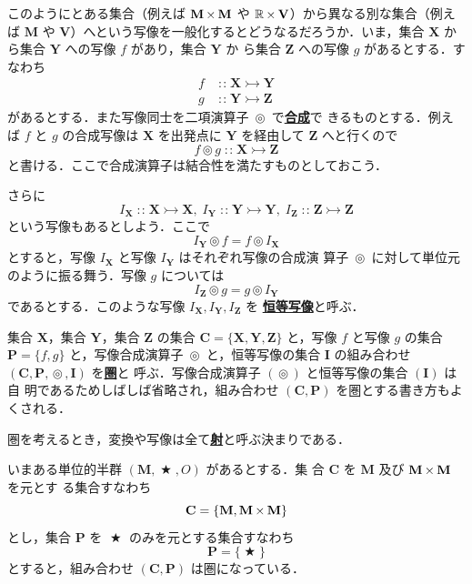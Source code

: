 \documentclass[a5paper,twoside,fleqn,draft]{jsbook}
\newcommand{\keyword}[1]{{\underline{\textbf{#1}}}}
\DeclareMathOperator{\mBinOp}{\bigstar}
\DeclareMathOperator{\mCompProj}{\circledcirc}
\DeclareMathOperator{\mIn}{{:\!:}}
\DeclareMathOperator{\mMorphTo}{\rightarrowtail} %
\DeclareMathOperator{\mSetTimes}{\bf{\times}} %
\newcommand{\mSet}[1]{\mathbf{#1}}
\newcommand{\mSpecialSet}[1]{\mathbb{#1}}
\newcommand{\mRSet}{\mSpecialSet{R}}
\newcommand{\mTupleWith}[1]{\left(#1\right)}
\newcommand{\mMorph}[2]{#1\mMorphTo#2} %
\begin{document}
このようにとある集合（例えば $\mSet{M}\mSetTimes\mSet{M}$ や
$\mRSet\mSetTimes\mSet{V}$）から異なる別な集合（例えば $\mSet{M}$ や
$\mSet{V}$）へという写像を一般化するとどうなるだろうか．いま，集合
$\mSet{X}$ から集合 $\mSet{Y}$ への写像 $f$ があり，集合 $\mSet{Y}$ か
ら集合 $\mSet{Z}$ への写像 $g$ があるとする．すなわち
\begin{align}
f&\mIn\mMorph{\mSet{X}}{\mSet{Y}}\\
g&\mIn\mMorph{\mSet{Y}}{\mSet{Z}}
\end{align}
があるとする．また写像同士を二項演算子 $\mCompProj$ で\keyword{合成}で
きるものとする．例えば $f$ と $g$ の合成写像は $\mSet{X}$ を出発点に
$\mSet{Y}$ を経由して $\mSet{Z}$ へと行くので
\begin{equation}
f\mCompProj g\mIn\mMorph{\mSet{X}}{\mSet{Z}}
\end{equation}
と書ける．ここで合成演算子は結合性を満たすものとしておこう．

さらに
\begin{equation}
I_\mSet{X}\mIn\mMorph{\mSet{X}}{\mSet{X}},\;
I_\mSet{Y}\mIn\mMorph{\mSet{Y}}{\mSet{Y}},\;
I_\mSet{Z}\mIn\mMorph{\mSet{Z}}{\mSet{Z}}
\end{equation}
という写像もあるとしよう．ここで
\begin{equation}
I_\mSet{Y}\mCompProj f=f\mCompProj I_\mSet{X}
\end{equation}
とすると，写像 $I_\mSet{X}$ と写像 $I_\mSet{Y}$ はそれぞれ写像の合成演
算子 $\mCompProj$ に対して単位元のように振る舞う．写像 $g$ については
\begin{equation}
I_\mSet{Z}\mCompProj g=g\mCompProj I_\mSet{Y}
\end{equation}
であるとする．このような写像 $I_\mSet{X},I_\mSet{Y},I_\mSet{Z}$ を
\keyword{恒等写像}と呼ぶ．

集合 $\mSet{X}$，集合 $\mSet{Y}$，集合 $\mSet{Z}$ の集合
$\mSet{C}=\{\mSet{X},\mSet{Y},\mSet{Z}\}$ と，写像 $f$ と写像
$g$ の集合 $\mSet{P}=\{f,g\}$ と，写像合成演算子 $\mCompProj$
と，恒等写像の集合 $\mSet{I}$ の組み合わせ
$\mTupleWith{\mSet{C},\mSet{P},\mCompProj,\mSet{I}}$ を\keyword{圏}と
呼ぶ．写像合成演算子 $(\mCompProj)$ と恒等写像の集合 $(\mSet{I})$ は自
明であるためしばしば省略され，組み合わせ
$\mTupleWith{\mSet{C},\mSet{P}}$ を圏とする書き方もよくされる．

圏を考えるとき，変換や写像は全て\keyword{射}と呼ぶ決まりである．

いまある単位的半群 $\mTupleWith{\mSet{M},\mBinOp,O}$ があるとする．集
合 $\mSet{C}$ を $\mSet{M}$ 及び $\mSet{M}\mSetTimes\mSet{M}$ を元とす
る集合すなわち
\begin{equation}
\mSet{C}=\{\mSet{M},\mSet{M}\mSetTimes\mSet{M}\}
\end{equation}
とし，集合 $\mSet{P}$ を $\mBinOp$ のみを元とする集合すなわち
\begin{equation}
\mSet{P}=\{\mBinOp\}
\end{equation}
とすると，組み合わせ $\mTupleWith{\mSet{C},\mSet{P}}$ は圏になっている．
\end{document}
